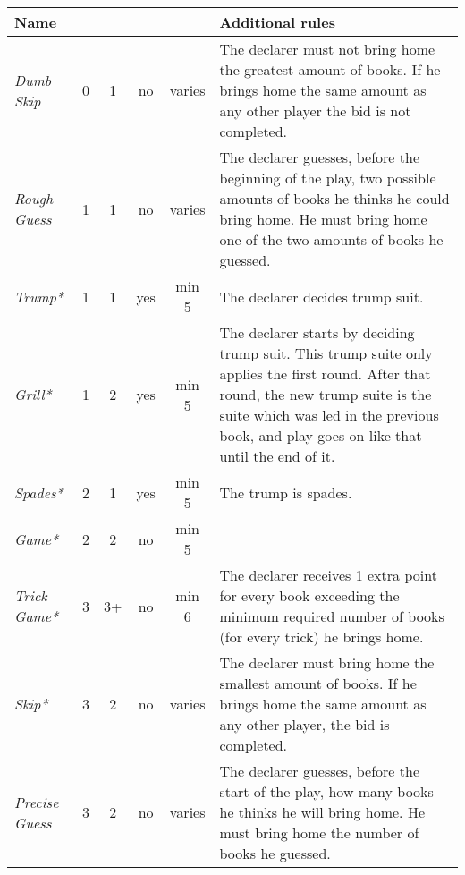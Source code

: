 \begin{table}
	\begin{center}
		\footnotesize {
			\begin{tabular*}{\textwidth}{ lcccc | p{5cm} }
					\textbf{Name} & \rotccw{\textbf{Worth}} & \rotccw{\textbf{Score}} & \rotccw{\textbf{Trump}} & \rotccw{\textbf{Books}} & \textbf{Additional rules}
					\\ \hline
					
					\textit{Dumb Skip} &
					0 & 1 & no & varies &
					The declarer must not bring home the greatest amount of books. If he brings home the same amount as any other player the bid is not completed.
					\\ \hline
					
					\textit{Rough Guess} &
					1 & 1 & no & varies &
					The declarer guesses, before the beginning of the play, two possible amounts of books he thinks he could bring home. He must bring home one of the two amounts of books he guessed.
					\\ \hline
					
					\textit{Trump*} &
					1 & 1 & yes & min 5 &
					The declarer decides trump suit.
					\\ \hline
					
					\textit{Grill*} &
					1 & 2 & yes & min 5 &
					The declarer starts by deciding trump suit. This trump suite only applies the first round. After that round, the new trump suite is the suite which was led in the previous book, and play goes on like that until the end of it. \\ \hline
					\textit{Spades*} &
					2 & 1 & yes & min 5 &
					The trump is spades.
					\\ \hline
					
					\textit{Game*} &
					2 & 2 & no & min 5 &
					\\ \hline
					
					\textit{Trick Game*} &
					3 & 3+ & no & min 6 &
					The declarer receives 1 extra point for every book exceeding the minimum required number of books (for every trick) he brings home.
					\\ \hline
					
					\textit{Skip*} &
					3 & 2 & no & varies &
					The declarer must bring home the smallest amount of books. If he brings home the same amount as any other player, the bid is completed.
					\\ \hline
					
					\textit{Precise Guess} &
					3 & 2 & no & varies &
					The declarer guesses, before the start of the play, how many books he thinks he will bring home. He must bring home the number of books he guessed.
					\\ \hline
					

\end{tabular*}}
\end{center}
\end{table}
